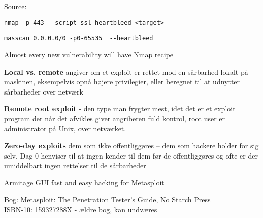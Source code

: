 \documentclass[Screen16to9,17pt]{foils}
\begin{document}
Source: 





\begin{list1}
\item \verb+nmap -p 443 --script ssl-heartbleed <target>+\\
\item \verb+masscan 0.0.0.0/0 -p0-65535  --heartbleed+\\
\end{list1}

\centerline{Almost every new vulnerability will have Nmap recipe}










\begin{list1}
\item {\bfseries Local vs. remote}
angiver om et exploit er rettet mod
en sårbarhed lokalt på maskinen, eksempelvis
opnå højere privilegier, eller beregnet
til at udnytter sårbarheder over netværk
\item {\bfseries Remote root exploit}
- den type man frygter mest, idet
det er et exploit program der når det afvikles giver
angriberen fuld kontrol, root user er administrator
på Unix, over netværket.
\item {\bfseries Zero-day exploits} dem som ikke offentliggøres -- dem
  som hackere holder for sig selv. Dag 0 henviser til at ingen kender
  til dem før de offentliggøres og ofte er der umiddelbart ingen
  rettelser til de sårbarheder
\end{list1}






\begin{list1}

\item {}
\item Armitage GUI fast and easy hacking for Metasploit\\
\item Bog: Metasploit: The Penetration Tester's Guide, No Starch Press\\
ISBN-10: 159327288X - ældre bog, kan undværes
\end{list1}
\end{document}
